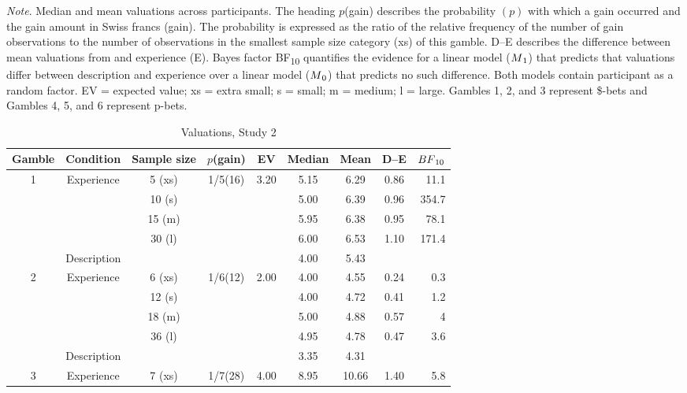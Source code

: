\documentclass[a4paper,man, natbib]{apa6} %
\begin{document}
\begin{ThreePartTable}
\begin{TableNotes}
\small
\item \textit{Note}. Median and mean valuations across participants. The heading $p$(gain) describes the probability $(p)$ with which a gain occurred and the gain amount in Swiss francs (gain). The probability is expressed as the ratio of the relative frequency of the number of gain observations to the number of observations in the smallest sample size category (xs) of this gamble. D--E describes the difference between mean valuations from  and experience (E). Bayes factor BF\textsubscript{10} quantifies the evidence for a linear model ($M\textsubscript{1}$) that predicts that valuations differ between description and experience over a linear model ($M\textsubscript{0}$) that predicts no such difference. Both models contain participant as a random factor. EV = expected value; xs = extra small; s = small; m = medium; l = large. Gambles 1, 2, and 3 represent \$-bets and Gambles 4, 5, and 6 represent p-bets.
\end{TableNotes}
\footnotesize
\begin{longtable}{ccccccccr}
\caption{Valuations, Study 2}\label{table:meansStudy3}\\
\toprule
Gamble & Condition & Sample size & \(p\)(gain) &  EV& Median & Mean& D--E& $BF\textsubscript{10}$\\
\hline
\multirow{5}{*}{1} &\multirow{4}{*}{Experience} & 5 (xs)  & \multirow{5}{*}{1/5(16)}& \multirow{5}{*}{3.20}
 & 5.15 & 6.29 & 0.86&11.1\\
&& 10 (s) &&& 5.00 & 6.39 & 0.96& 354.7\\
&& 15 (m)&&&5.95 & 6.38 & 0.95&78.1\\
&& 30 (l)&&& 6.00 & 6.53 & 1.10&171.4\\
& Description &&&&  4.00 & 5.43 && \\
\hline
\multirow{5}{*}{2} &\multirow{4}{*}{Experience} & 6 (xs)  & \multirow{5}{*}{1/6(12)}& \multirow{5}{*}{2.00}
& 4.00 & 4.55 & 0.24&0.3 \\
&& 12 (s) &&&   4.00 & 4.72 & 0.41&1.2 \\
&& 18 (m) &&&   5.00 & 4.88 & 0.57 &4\\
&& 36 (l) &&&   4.95 & 4.78 & 0.47 &3.6\\
& Description &&&&   3.35 & 4.31 && \\
\hline
\multirow{5}{*}{3} &\multirow{4}{*}{Experience} & 7 (xs)  & \multirow{5}{*}{1/7(28)}&  \multirow{5}{*}{4.00}
& 8.95 & 10.66 & 1.40&5.8\\

\end{longtable}
\end{ThreePartTable}
\end{document}
